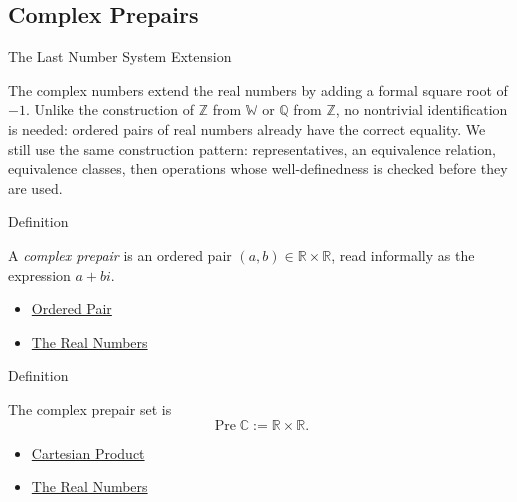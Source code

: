 \subsection*{Complex Prepairs}

\begin{topicbox}{The Last Number System Extension}
\begin{exposition}
The complex numbers extend the real numbers by adding a formal square root of
$-1$. Unlike the construction of $\mathbb{Z}$ from $\mathbb{W}$ or
$\mathbb{Q}$ from $\mathbb{Z}$, no nontrivial identification is needed:
ordered pairs of real numbers already have the correct equality. We still use
the same construction pattern: representatives, an equivalence relation,
equivalence classes, then operations whose well-definedness is checked before
they are used.
\end{exposition}
\end{topicbox}

\begin{definitionbox}{Definition}
\begin{definition}
\label{def:complex-prepair}
A \emph{complex prepair} is an ordered pair $(a,b)\in\mathbb{R}\times\mathbb{R}$,
read informally as the expression $a+bi$.
\end{definition}
\end{definitionbox}

\begin{dependencies}
\begin{itemize}
  \item \hyperref[def:ordered-pair]{Ordered Pair}
  \item \hyperref[def:reals]{The Real Numbers}
\end{itemize}
\end{dependencies}

\begin{definitionbox}{Definition}
\begin{definition}
\label{def:complex-prepair-set}
The complex prepair set is
\[
\operatorname{Pre}\mathbb{C}:=\mathbb{R}\times\mathbb{R}.
\]
\end{definition}
\end{definitionbox}

\begin{dependencies}
\begin{itemize}
  \item \hyperref[def:cartesian-product-rel]{Cartesian Product}
  \item \hyperref[def:reals]{The Real Numbers}
\end{itemize}
\end{dependencies}


